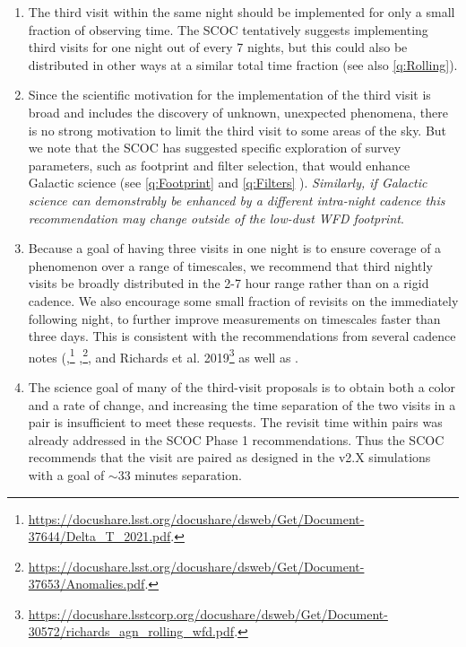 \begin{enumerate}

\item The third visit within the same night should be implemented for only a small fraction of observing time. The SCOC tentatively suggests implementing third visits for one night out of every 7 nights, but this could also be distributed in other ways at a similar total time fraction (see also \autoref{q:Rolling}).

\item Since the scientific motivation for the implementation of the third visit is broad and includes the discovery of unknown, unexpected phenomena, there is no strong motivation to limit the third visit to some areas of the sky. But we note that the SCOC has suggested specific exploration of survey parameters, such as footprint and filter selection, that would enhance Galactic science (see \autoref{q:Footprint} and \autoref{q:Filters} ). \emph{Similarly, if Galactic science can demonstrably be enhanced by a different intra-night cadence this recommendation may change outside of the low-dust WFD footprint}.


\item Because a goal of having three visits in one night is to ensure coverage of a phenomenon over a range of timescales, we recommend that third nightly visits be broadly distributed in the 2-7 hour range rather than on a rigid cadence.
We also encourage some small fraction of revisits on the immediately following night, to further improve measurements on timescales faster than three days.
This is consistent with the recommendations from several cadence notes (\citealt{2022ApJS..258...13B},\footnote{\url{https://docushare.lsst.org/docushare/dsweb/Get/Document-37644/Delta_T_2021.pdf}.} \citealt{2022ApJS..258....2L},\footnote{\url{https://docushare.lsst.org/docushare/dsweb/Get/Document-37653/Anomalies.pdf}.}, and Richards et al. 2019\footnote{\url{https://docushare.lsstcorp.org/docushare/dsweb/Get/Document-30572/richards_agn_rolling_wfd.pdf}.} as well as \citealt{2019PASP..131f8002B}.


\item 
The science goal of many of the third-visit proposals is to obtain both a color and a rate of change, and increasing the time separation of the two visits in a pair is insufficient to meet these requests.
The revisit time within pairs was already addressed in the SCOC Phase 1 recommendations. Thus the SCOC recommends that the visit are paired as designed in the v2.X simulations with a goal of $\sim33$ minutes separation.


\end{enumerate}
